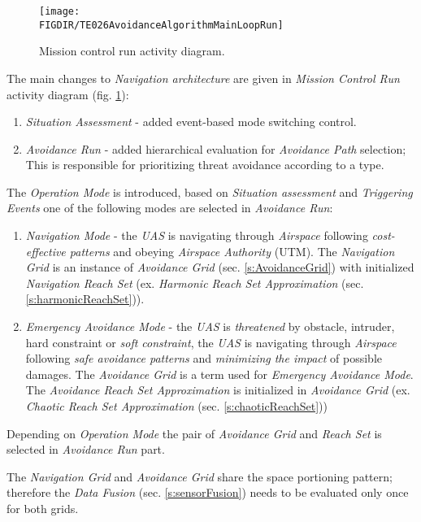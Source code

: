 \begin{figure}[H]
    \centering
    \texttt{[image: \\FIGDIR/TE026AvoidanceAlgorithmMainLoopRun]}
    \caption{Mission control run activity diagram.}
    \label{fig:missionControlRunActivityDiagram}
\end{figure}

\noindent The main changes to \emph{Navigation architecture} are given in \emph{Mission Control Run} activity diagram (fig. \ref{fig:missionControlRunActivityDiagram}):

\begin{enumerate}
    \item \emph{Situation Assessment} - added event-based mode switching control. 
   
    \item \emph{Avoidance Run} - added hierarchical evaluation for \emph{Avoidance Path} selection; This is responsible for prioritizing threat avoidance according to a type. 
\end{enumerate}

\noindent The \emph{Operation Mode} is introduced, based on \emph{Situation assessment} and \emph{Triggering Events} one of the following modes are selected in \emph{Avoidance Run}:

\begin{enumerate}
    \item \emph{Navigation Mode} - the \emph{UAS} is navigating through \emph{Airspace} following \emph{cost-effective patterns} and obeying \emph{Airspace Authority} (UTM). The \emph{Navigation Grid} is an instance of \emph{Avoidance Grid} (sec. \ref{s:AvoidanceGrid}) with initialized \emph{Navigation Reach Set} (ex. \emph{Harmonic Reach Set Approximation} (sec. \ref{s:harmonicReachSet})).
    
    \item \emph{Emergency Avoidance Mode} - the \emph{UAS} is \emph{threatened} by obstacle, intruder, hard constraint or \emph{soft constraint}, the \emph{UAS} is navigating through \emph{Airspace} following \emph{safe avoidance patterns} and \emph{minimizing the impact} of possible damages. The \emph{Avoidance Grid} is a term used for \emph{Emergency Avoidance Mode}. The \emph{Avoidance Reach Set Approximation} is initialized in \emph{Avoidance Grid} (ex. \emph{Chaotic Reach Set Approximation} (sec. \ref{s:chaoticReachSet}))
\end{enumerate}

\begin{note}
    Depending on \emph{Operation Mode} the pair of \emph{Avoidance Grid} and \emph{Reach Set} is selected in \emph{Avoidance Run} part.
    
    
    The \emph{Navigation Grid} and \emph{Avoidance Grid} share the space portioning pattern; therefore the \emph{Data Fusion} (sec. \ref{s:sensorFusion}) needs to be evaluated only once for both grids. 
\end{note}



